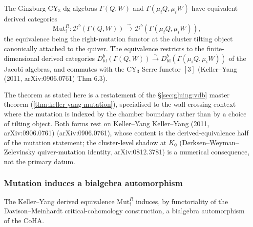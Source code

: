 \begin{theorem}
 \label{thm:keller-yang-mutation-wc}
 The Ginzburg CY$_3$ dg-algebras $\Gamma(Q, W)$ and $\Gamma(\mu_i Q,
 \mu_i W)$ have equivalent derived categories
 \[
 \mathrm{Mut}_i^R \colon \mathcal{D}^b(\Gamma(Q, W)) \xrightarrow{\;\sim\;}
 \mathcal{D}^b(\Gamma(\mu_i Q, \mu_i W)),
 \]
 the equivalence being the right-mutation functor at the cluster tilting
 object canonically attached to the quiver. The equivalence restricts to
 the finite-dimensional derived categories
 $D^b_{\mathrm{fd}}(\Gamma(Q,W)) \xrightarrow{\sim}
 D^b_{\mathrm{fd}}(\Gamma(\mu_i Q, \mu_i W))$ of the Jacobi algebras, and
 commutes with the CY$_3$ Serre functor $[3]$ (Keller--Yang
 (2011, arXiv:0906.0761) Thm 6.3).
\end{theorem}

\begin{remark}
 \label{rem:keller-yang-restatement}
 The theorem as stated here is a restatement of the \S\ref{sec:gluing:vdb} master
 theorem (\ref{thm:keller-yang-mutation}), specialised to the
 wall-crossing context where the mutation is indexed by the chamber
 boundary rather than by a choice of tilting object. Both forms rest
 on Keller--Yang Keller--Yang (2011, arXiv:0906.0761) (arXiv:0906.0761), whose content
 is the derived-equivalence half of the mutation statement; the
 cluster-level shadow at $K_0$ (Derksen--Weyman--Zelevinsky quiver-mutation
 identity, arXiv:0812.3781) is a numerical consequence, not the
 primary datum.
\end{remark}

\subsubsection{Mutation induces a bialgebra automorphism}
\label{subsec:mutation-bialg-auto}

The Keller--Yang derived equivalence $\mathrm{Mut}_i^R$ induces, by
functoriality of the Davison--Meinhardt critical-cohomology construction,
a bialgebra automorphism of the CoHA.

